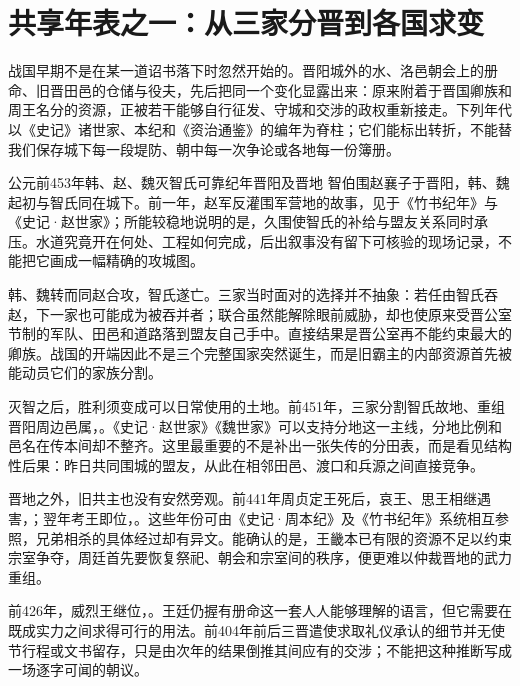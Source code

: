 \section{共享年表之一：从三家分晋到各国求变}

战国早期不是在某一道诏书落下时忽然开始的。晋阳城外的水、洛邑朝会上的册命、旧晋田邑的仓储与役夫，先后把同一个变化显露出来：原来附着于晋国卿族和周王名分的资源，正被若干能够自行征发、守城和交涉的政权重新接走。下列年代以《史记》诸世家、本纪和《资治通鉴》的编年为脊柱；它们能标出转折，不能替我们保存城下每一段堤防、朝中每一次争论或各地每一份簿册。

\begin{event}{公元前453年}{韩、赵、魏灭智氏}{可靠纪年}{晋阳及晋地}
智伯围赵襄子于晋阳，韩、魏起初与智氏同在城下。前一年，赵军反灌围军营地的故事，见于《竹书纪年》与《史记·赵世家》；所能较稳地说明的是，久围使智氏的补给与盟友关系同时承压。水道究竟开在何处、工程如何完成，后出叙事没有留下可核验的现场记录，不能把它画成一幅精确的攻城图。

韩、魏转而同赵合攻，智氏遂亡。三家当时面对的选择并不抽象：若任由智氏吞赵，下一家也可能成为被吞并者；联合虽然能解除眼前威胁，却也使原来受晋公室节制的军队、田邑和道路落到盟友自己手中。直接结果是晋公室再不能约束最大的卿族。战国的开端因此不是三个完整国家突然诞生，而是旧霸主的内部资源首先被能动员它们的家族分割。
\end{event}

灭智之后，胜利须变成可以日常使用的土地。前451年，三家分割智氏故地、重组晋阳周边邑属，。《史记·赵世家》《魏世家》可以支持分地这一主线，分地比例和邑名在传本间却不整齐。这里最重要的不是补出一张失传的分田表，而是看见结构性后果：昨日共同围城的盟友，从此在相邻田邑、渡口和兵源之间直接竞争。

晋地之外，旧共主也没有安然旁观。前441年周贞定王死后，哀王、思王相继遇害，；翌年考王即位，。这些年份可由《史记·周本纪》及《竹书纪年》系统相互参照，兄弟相杀的具体经过却有异文。能确认的是，王畿本已有限的资源不足以约束宗室争夺，周廷首先要恢复祭祀、朝会和宗室间的秩序，便更难以仲裁晋地的武力重组。

前426年，威烈王继位，。王廷仍握有册命这一套人人能够理解的语言，但它需要在既成实力之间求得可行的用法。前404年前后三晋遣使求取礼仪承认的细节并无使节行程或文书留存，只是由次年的结果倒推其间应有的交涉；不能把这种推断写成一场逐字可闻的朝议。

